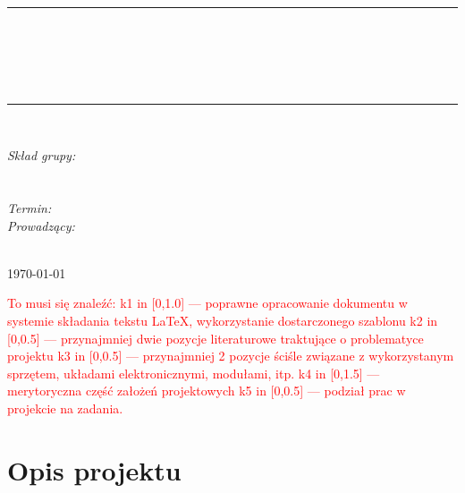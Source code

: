 \documentclass[10pt, a4paper]{article}
\begin{document}
\def\tablename{Tabela}	%

\begin{titlepage}
	\begin{center}
		\textsc{\LARGE \formakursu}\\[1cm]		
		\textsc{\Large \kurs}\\[0.5cm]		
		\rule{\textwidth}{0.08cm}\\[0.4cm]
		{\huge \bfseries \doctype}\\[1cm]
		{\huge \bfseries \projectname}\\[0.5cm]
		{\huge \bfseries \acronim}\\[0.4cm]
		\rule{\textwidth}{0.08cm}\\[1cm]
		
		\begin{flushright} \large
		\emph{Skład grupy:}\\
		\osobaA\\
		\osobaB\\[0.4cm]
		
		\emph{Termin: }\termin\\[0.4cm]

		\emph{Prowadzący:} \\
		\prowadzacy \\
		
		\end{flushright}
		
		\vfill
		
		{\large \today}
	\end{center}	
\end{titlepage}

\newpage
\tableofcontents
\newpage

\textcolor{Red}{To musi się znaleźć:} \newline
\textcolor{Red}{k1 in [0,1.0] — poprawne opracowanie dokumentu w systemie składania tekstu LaTeX, wykorzystanie dostarczonego szablonu \newline
	k2 in [0,0.5] — przynajmniej dwie pozycje literaturowe traktujące o problematyce projektu \newline
	k3 in [0,0.5] — przynajmniej 2 pozycje ściśle związane z wykorzystanym sprzętem, układami elektronicznymi,  modułami, itp.\newline
	k4 in [0,1.5] — merytoryczna część założeń projektowych \newline
	k5 in [0,0.5] — podział prac w projekcie na zadania.\newline}
\section{Opis projektu}
\label{sec:OpisProjektu}
\end{document}
